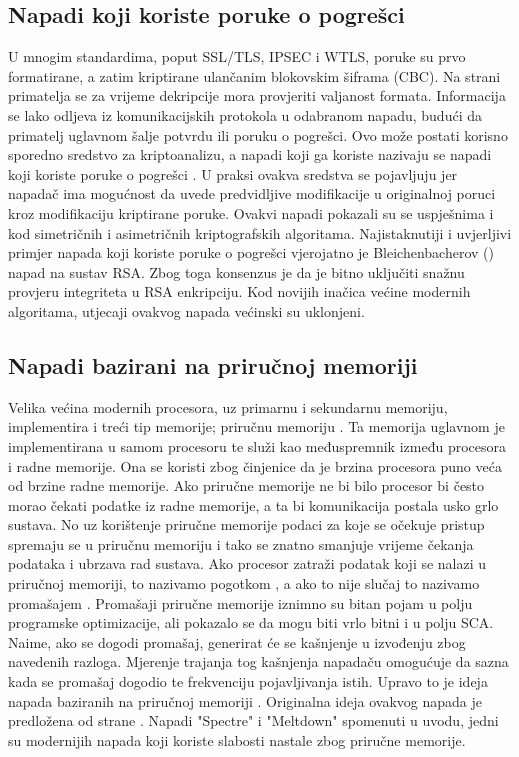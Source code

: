 \documentclass[times, utf8, diplomski]{fer}
\begin{document}
\subsection{Napadi koji koriste poruke o pogrešci}
U mnogim standardima, poput SSL/TLS, IPSEC i WTLS, poruke su prvo formatirane, a zatim kriptirane ulančanim blokovskim šiframa (CBC). Na strani primatelja se za vrijeme dekripcije mora provjeriti valjanost formata. Informacija se lako odljeva iz komunikacijskih protokola u odabranom napadu, budući da primatelj uglavnom šalje potvrdu ili poruku o pogrešci. Ovo može postati korisno sporedno sredstvo za kriptoanalizu, a napadi koji ga koriste nazivaju se napadi koji koriste poruke o pogrešci . U praksi ovakva sredstva se pojavljuju jer napadač ima mogućnost da uvede predvidljive modifikacije u originalnoj poruci kroz modifikaciju kriptirane poruke. Ovakvi napadi pokazali su se uspješnima i kod simetričnih i asimetričnih kriptografskih algoritama. Najistaknutiji i uvjerljivi primjer napada koji koriste poruke o pogrešci vjerojatno je Bleichenbacherov (\citeyear{bleichenbacher1998chosen}) napad na sustav RSA. Zbog toga konsenzus je da je bitno uključiti snažnu provjeru integriteta u RSA enkripciju. Kod novijih inačica većine modernih algoritama, utjecaji ovakvog napada većinski su uklonjeni.

\subsection{Napadi bazirani na priručnoj memoriji}

Velika većina modernih procesora, uz primarnu i sekundarnu memoriju, implementira i treći tip memorije; priručnu memoriju .
Ta memorija uglavnom je implementirana u samom procesoru te služi kao međuspremnik između procesora i radne memorije. Ona se koristi zbog činjenice da je brzina procesora puno veća od brzine radne memorije. Ako priručne memorije ne bi bilo procesor bi često morao čekati podatke iz radne memorije, a ta bi komunikacija postala usko grlo  sustava. No uz korištenje priručne memorije podaci za koje se očekuje pristup spremaju se u priručnu memoriju i tako se znatno smanjuje vrijeme čekanja podataka i ubrzava rad sustava. Ako procesor zatraži podatak koji se nalazi u priručnoj memoriji, to nazivamo pogotkom , a ako to nije slučaj to nazivamo promašajem . Promašaji priručne memorije iznimno su bitan pojam u polju programske optimizacije, ali pokazalo se da mogu biti vrlo bitni i u polju SCA. Naime, ako se dogodi promašaj, generirat će se kašnjenje u izvođenju zbog navedenih razloga. Mjerenje trajanja tog kašnjenja napadaču omogućuje da sazna kada se promašaj dogodio te frekvenciju pojavljivanja istih. Upravo to je ideja napada baziranih na priručnoj memoriji . Originalna ideja ovakvog napada je predložena od strane \cite{kelsey1998side}. Napadi "Spectre" i "Meltdown" spomenuti u uvodu, jedni su modernijih napada koji koriste slabosti nastale zbog priručne memorije.
\end{document}
